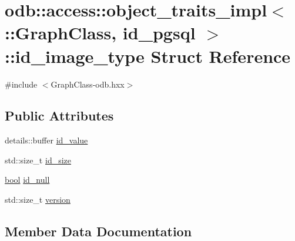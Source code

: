 \hypertarget{structodb_1_1access_1_1object__traits__impl_3_01_1_1_graph_class_00_01id__pgsql_01_4_1_1id__image__type}{}\section{odb\+:\+:access\+:\+:object\+\_\+traits\+\_\+impl$<$ \+:\+:Graph\+Class, id\+\_\+pgsql $>$\+:\+:id\+\_\+image\+\_\+type Struct Reference}
\label{structodb_1_1access_1_1object__traits__impl_3_01_1_1_graph_class_00_01id__pgsql_01_4_1_1id__image__type}


{\ttfamily \#include $<$Graph\+Class-\/odb.\+hxx$>$}

\subsection*{Public Attributes}
\begin{DoxyCompactItemize}
\item 
details\+::buffer \hyperlink{structodb_1_1access_1_1object__traits__impl_3_01_1_1_graph_class_00_01id__pgsql_01_4_1_1id__image__type_a602c482caa519136f50a5fd4ed6476db}{id\+\_\+value}
\item 
std\+::size\+\_\+t \hyperlink{structodb_1_1access_1_1object__traits__impl_3_01_1_1_graph_class_00_01id__pgsql_01_4_1_1id__image__type_a72e49bbf9815831238ad851bafa11b88}{id\+\_\+size}
\item 
\hyperlink{classodb_1_1access_1_1object__traits_3_01_1_1_graph_class_01_4_adb6d76b31575782f2c201eb3ab510e59}{bool} \hyperlink{structodb_1_1access_1_1object__traits__impl_3_01_1_1_graph_class_00_01id__pgsql_01_4_1_1id__image__type_a9f49f7869e1aa232978bffd1799bc90b}{id\+\_\+null}
\item 
std\+::size\+\_\+t \hyperlink{structodb_1_1access_1_1object__traits__impl_3_01_1_1_graph_class_00_01id__pgsql_01_4_1_1id__image__type_ac06f8bba722a9971df8e8bc0ddf2059c}{version}
\end{DoxyCompactItemize}


\subsection{Member Data Documentation}
\hypertarget{structodb_1_1access_1_1object__traits__impl_3_01_1_1_graph_class_00_01id__pgsql_01_4_1_1id__image__type_a9f49f7869e1aa232978bffd1799bc90b}{}
